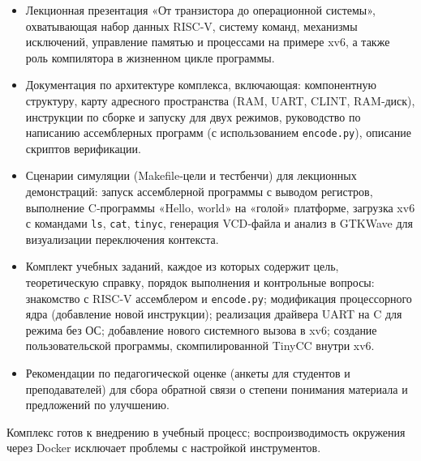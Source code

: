 \begin{itemize}
\item Лекционная презентация «От транзистора до операционной системы», охватывающая набор данных RISC‑V, систему команд, механизмы исключений, управление памятью и процессами на примере xv6, а также роль компилятора в жизненном цикле программы.
\item Документация по архитектуре комплекса, включающая: компонентную структуру, карту адресного пространства (RAM, UART, CLINT, RAM‑диск), инструкции по сборке и запуску для двух режимов, руководство по написанию ассемблерных программ (с использованием \texttt{encode.py}), описание скриптов верификации.
\item Сценарии симуляции (Makefile‑цели и тестбенчи) для лекционных демонстраций: запуск ассемблерной программы с выводом регистров, выполнение C‑программы «Hello, world» на «голой» платформе, загрузка xv6 с командами \texttt{ls}, \texttt{cat}, \texttt{tinyc}, генерация VCD‑файла и анализ в GTKWave для визуализации переключения контекста.
\item Комплект учебных заданий, каждое из которых содержит цель, теоретическую справку, порядок выполнения и контрольные вопросы: знакомство с RISC‑V ассемблером и \texttt{encode.py}; модификация процессорного ядра (добавление новой инструкции); реализация драйвера UART на C для режима без ОС; добавление нового системного вызова в xv6; создание пользовательской программы, скомпилированной TinyCC внутри xv6.
\item Рекомендации по педагогической оценке (анкеты для студентов и преподавателей) для сбора обратной связи о степени понимания материала и предложений по улучшению.
\end{itemize}

Комплекс готов к внедрению в учебный процесс; воспроизводимость окружения через Docker исключает проблемы с настройкой инструментов.